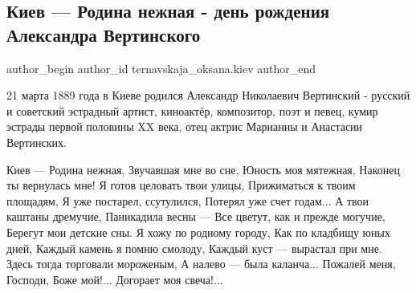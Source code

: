  
 
 
 
 
 
\subsection{Киев — Родина нежная - день рождения Александра Вертинского}
\label{sec:21_03_2021.fb.ternavskaja_oksana.kiev.1.kiev_vertinskij_birthday}
 
\ifcmt
 author_begin
   author_id ternavskaja_oksana.kiev
 author_end
\fi

21 марта 1889 года в Киеве родился  Александр Николаевич Вертинский - русский и
советский эстрадный артист, киноактёр, композитор, поэт и певец, кумир эстрады
первой половины XX века, отец актрис Марианны и Анастасии Вертинских.

\begin{multicols}{2}
\obeycr
Киев — Родина нежная,
Звучавшая мне во сне,
Юность моя мятежная,
Наконец ты вернулась мне!
\smallskip
Я готов целовать твои улицы,
Прижиматься к твоим площадям,
Я уже постарел, ссутулился,
Потерял уже счет годам...
\smallskip
А твои каштаны дремучие,
Паникадила весны —
Все цветут, как и прежде могучие,
Берегут мои детские сны.
\smallskip
Я хожу по родному городу,
Как по кладбищу юных дней,
Каждый камень я помню смолоду,
Каждый куст — вырастал при мне.
\smallskip
Здесь тогда торговали мороженым,
А налево — была каланча...
Пожалей меня, Господи, Боже мой!...
Догорает моя свеча!...
\restorecr
\end{multicols}
